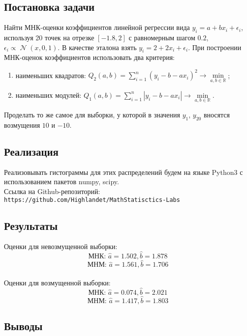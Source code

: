 \documentclass[14pt]{extarticle}
\DeclareMathOperator{\normal}{\mathcal{N}} %
\begin{document}
\subsection{Постановка задачи}
Найти МНК-оценки коэффициентов линейной регрессии вида \(y_i=a+bx_i+\epsilon_i\), используя 20 точек на отрезке \([-1.8, 2]\) с равномерным шагом \(0.2\), \(\epsilon_i\propto\normal(x, 0, 1)\). В качестве эталона взять \(y_i=2+2x_i+\epsilon_i\). При построении МНК-оценок коэффициентов использовать два критерия:
\begin{enumerate}
    \item наименьших квадратов: \(Q_2(a, b)=\sum\limits_{i=1}^n(y_i-b-ax_i)^2\to\min\limits_{a, b\in\mathbb{R}}^{}\);\\
    \item наименьших модулей: \(Q_1(a, b)=\sum\limits_{i=1}^n|y_i-b-ax_i|\to\min\limits_{a, b\in\mathbb{R}}^{}.\)
\end{enumerate}
Проделать то же самое для выборки, у которой в значения \(y_1\), \(y_{20}\) вносятся возмущения \(10\) и \(-10\).

\subsection{Реализация}
Реализовывать гистограммы для этих распределений будем на языке Python3 с использованием пакетов numpy, scipy. \\
Ссылка на Github-репозиторий: \\
\texttt{https://github.com/Highlandet/MathStatisctics-Labs}

\subsection{Результаты}
Оценки для невозмущенной выборки:
\[\text{МНК: } \widehat{a} = 1.502, \widehat{b} = 1.878\]
\[\text{МНМ: } \widehat{a} = 1.561, \widehat{b} = 1.706\]
\\
Оценки для возмущенной выборки:
\[\text{МНК: } \widehat{a} = 0.074, \widehat{b} = 2.021\]
\[\text{МНМ: } \widehat{a} = 1.417, \widehat{b} = 1.803\]

\subsection{Выводы}
\end{document}
